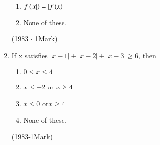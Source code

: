 \documentclass[journal]{IEEEtran}
\begin{document}
\begin{enumerate}
\begin{multicols}{2}
\begin{enumerate}
      \item $f\left(|x|\right)=|f\left(x\right)|$

      \item None of these.
      \end{enumerate}
  \end{multicols}
  \hfill
  (1983 - 1Mark)



  \item If x satisfies $|x-1| + |x-2| + |x-3|\geq6$, then
  \begin{multicols}{2}
    \begin{enumerate}
        

      \item $0\leq x\leq4$
      
      \item $x \leq-2$ or $x\geq4$
      
      \item $x\leq0$ or$x\geq4$
      
      \item None of these.

    \end{enumerate}
  \end{multicols}
  \hfill
  (1983-1Mark)



  

\end{enumerate}
\end{document}
